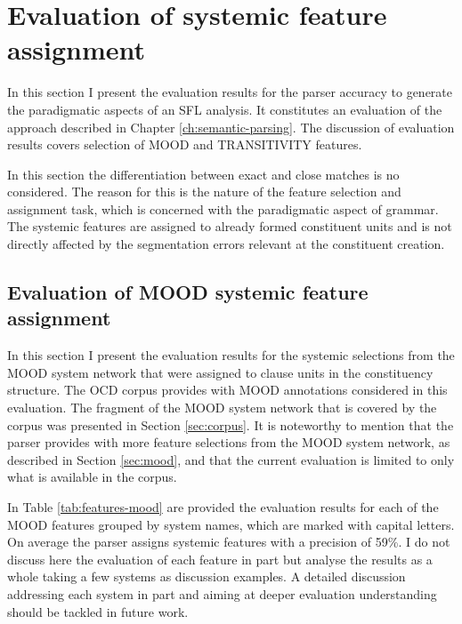 \section{Evaluation of systemic feature assignment}
\label{sec:systemic-evaluation}
    
    In this section I present the evaluation results for the parser accuracy to generate the paradigmatic aspects of an SFL analysis. It constitutes an evaluation of the approach described in Chapter \ref{ch:semantic-parsing}. The discussion of evaluation results covers selection of MOOD and TRANSITIVITY features. %
    
    In this section the differentiation between exact and close matches is no considered. The reason for this is the nature of the feature selection and assignment task, which is concerned with the paradigmatic aspect of grammar. The systemic features are assigned to already formed constituent units and is not directly affected by the segmentation errors relevant at the constituent creation. 
    
\subsection{Evaluation of MOOD systemic feature assignment}
\label{sec:systemic-evaluation-MOOD}

    In this section I present the evaluation results for the systemic selections from the MOOD system network that were assigned to clause units in the constituency structure. The OCD corpus provides with MOOD annotations considered in this evaluation. The fragment of the MOOD system network that is covered by the corpus was presented in Section \ref{sec:corpus}. It is noteworthy to mention that the parser provides with more feature selections from the MOOD system network, as described in Section \ref{sec:mood}, and that the current evaluation is limited to only what is available in the corpus.

    In Table \ref{tab:features-mood} are provided the evaluation results for each of the MOOD features grouped by system names, which are marked with capital letters. On average the parser assigns systemic features with a precision of 59\%. I do not discuss here the evaluation of each feature in part but analyse the results as a whole taking a few systems as discussion examples. A detailed discussion addressing each system in part and aiming at deeper evaluation understanding should be tackled in future work.

